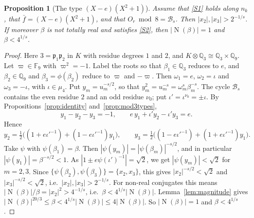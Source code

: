 \documentclass[11pt,a4paper]{article}
\newtheorem{proposition}[theorem]{Proposition}
\theoremstyle{definition}
\theoremstyle{remark}
\newcommand{\Q}{\mathbb{Q}}
\newcommand{\F}{\mathbb{F}}
\newcommand{\Qt}{\mathbb{Q}_3}
\DeclareMathOperator{\Nm}{N}
\begin{document}
\begin{proposition}[The type $(X-e)(X^2+1)$]\label{prop:b0}
Assume that \ref{S1} holds along $n_k$, that $\bar f=(X-e)(X^2+1)$, and that $O_r\bmod8=\mathcal B_s$.
Then $|x_2|,|x_3|>2^{-1/s}$.
If moreover $\beta$ is not totally real and satisfies \ref{S2}, then $|\Nm(\beta)|=1$ and $\beta<4^{1/s}$.
\end{proposition}
\begin{proof}
Here $3=\mathfrak p_1\mathfrak p_2$ in $K$ with residue degrees $1$ and $2$, and $K\otimes\Qt\cong\Qt\times\Q_9$.
Let $\varpi\in\F_9$ with $\varpi^2=-1$.
Label the roots so that $\beta_1\in\Qt$ reduces to $e$, and $\beta_2\in\Q_9$ and $\beta_3=\phi(\beta_2)$ reduce to $\varpi$ and $-\varpi$.
Then $\omega_1=e$, $\omega_2=\iota$ and $\omega_3=-\iota$, with $\iota\in\mu_4$.
Put $y_m=u_m^{-s/2}$, so that $y_m^2=u_m^{-s}=\omega_m^s\beta_m^{-s}$.
The cycle $\mathcal B_s$ contains the even residue $2$ and an odd residue $\nu_0$; put $\iota'=\iota^{\nu_0}=\pm\iota$.
By Propositions~\ref{prop:identity} and~\ref{prop:mod3types},
\[
 y_1-y_2-y_3=-1,\qquad e\,y_1+\iota' y_2-\iota' y_3=e .
\]
Hence
\[
 y_2=\tfrac12\bigl((1+e\iota'^{-1})+(1-e\iota'^{-1})y_1\bigr),\qquad y_3=\tfrac12\bigl((1-e\iota'^{-1})+(1+e\iota'^{-1})y_1\bigr).
\]
Take $\psi$ with $\psi(\beta_1)=\beta$. Then $|\psi(y_m)|=|\psi(\beta_m)|^{-s/2}$, and in particular $|\psi(y_1)|=\beta^{-s/2}<1$.
As $|1\pm e\psi(\iota')^{-1}|=\sqrt2$, we get $|\psi(y_m)|<\sqrt2$ for $m=2,3$.
Since $\{\psi(\beta_2),\psi(\beta_3)\}=\{x_2,x_3\}$, this gives $|x_2|^{-s/2}<\sqrt2$ and $|x_3|^{-s/2}<\sqrt2$, i.e.\ $|x_2|,|x_3|>2^{-1/s}$.
For non-real conjugates this means $|\Nm(\beta)|/\beta=|x_2|^2>4^{-1/s}$, i.e.\ $\beta<4^{1/s}|\Nm(\beta)|$.
Lemma~\ref{lem:magnitude} gives $|\Nm(\beta)|^{20/3}\le\beta<4^{1/s}|\Nm(\beta)|\le4|\Nm(\beta)|$. So $|\Nm(\beta)|=1$ and $\beta<4^{1/s}$.
\end{proof}
\end{document}
